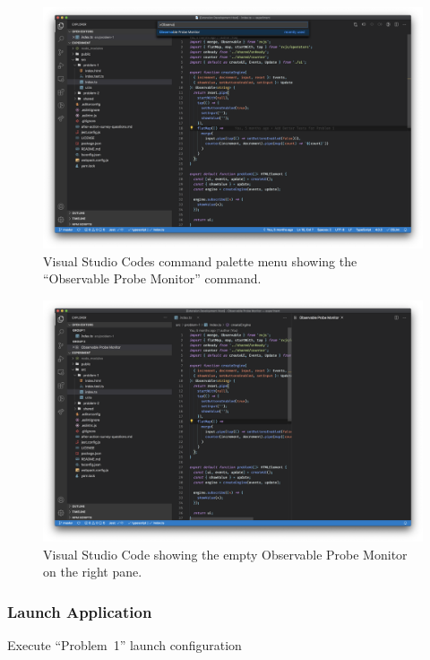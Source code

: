 \documentclass[sigplan,screen,nonacm,review]{acmart}
\begin{document}
\begin{figure}[ht]
	\centering
	\includegraphics[width=\columnwidth]{walkthrough-screenshots/step5-1.png}
	\Description{}
	\caption{Visual Studio Codes command palette menu showing the ``Observable Probe Monitor'' command.}
	\label{fig:walkthrough-screesnhot-step-5-1}
\end{figure}

\begin{figure}[ht]
	\centering
	\includegraphics[width=\columnwidth]{walkthrough-screenshots/step5-2.png}
	\Description{}
	\caption{Visual Studio Code showing the empty Observable Probe Monitor on the right pane.}
	\label{fig:walkthrough-screesnhot-step-5-2}
\end{figure}

\subsubsection{Launch Application}
Execute ``Problem~1'' launch configuration
\end{document}
